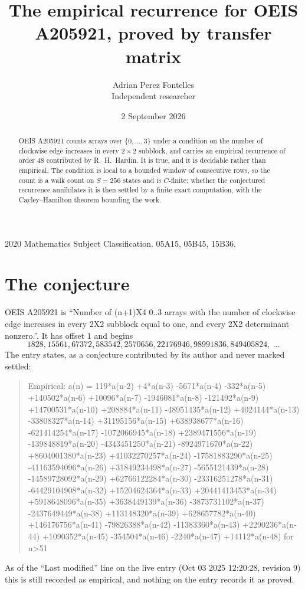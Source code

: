 \documentclass[11pt,a4paper]{article}
\title{The empirical recurrence for OEIS A205921, proved by transfer matrix}
\author{Adrian Perez Fontelles\\ \small Independent researcher}
\date{2 September 2026}
\theoremstyle{plain}
\theoremstyle{definition}
\begin{document}
\maketitle

\begin{abstract}
OEIS A205921 counts arrays over $\{0,\dots,3\}$ under a condition on the number of clockwise edge increases
in every $2\times2$ subblock, and carries an empirical recurrence of order $48$ contributed by
R.~H.~Hardin. It is true, and it is decidable rather than empirical. The condition is local to
a bounded window of consecutive rows, so the count is a walk count on $S=256$ states and is
$C$-finite; whether the conjectured recurrence annihilates it is then settled by a finite exact
computation, with the Cayley--Hamilton theorem bounding the work.
\end{abstract}

\noindent\small 2020 Mathematics Subject Classification. 05A15, 05B45, 15B36.\normalsize

\section{The conjecture}

OEIS A205921 is ``Number of (n+1)X4 0..3 arrays with the number of clockwise edge increases in every 2X2 subblock equal to one, and every 2X2 determinant nonzero.''. It has offset $1$ and begins
\[
1828, 15561, 67372, 583542, 2570656, 22176946, 98991836, 849405824,\ \dots
\]
The entry states, as a conjecture contributed by its author and never marked settled:
\begin{quote}
Empirical: a(n) = 119*a(n-2) +4*a(n-3) -5671*a(n-4) -332*a(n-5) +140502*a(n-6) +10096*a(n-7) -1946081*a(n-8) -121492*a(n-9) +14700531*a(n-10) +208884*a(n-11) -48951435*a(n-12) +4024144*a(n-13) -33808327*a(n-14) +31195156*a(n-15) +638938677*a(n-16) -621414254*a(n-17) -1072066945*a(n-18) +2389471556*a(n-19) -139848819*a(n-20) -4343451250*a(n-21) -8924971670*a(n-22) +8604001380*a(n-23) +41032270257*a(n-24) -17581883290*a(n-25) -41163594096*a(n-26) +31849234498*a(n-27) -5655121439*a(n-28) -14589728092*a(n-29) +62766122284*a(n-30) -23316251278*a(n-31) -64429104908*a(n-32) +15204624364*a(n-33) +20441413453*a(n-34) +5918648096*a(n-35) +3638449139*a(n-36) -3873731102*a(n-37) -2437649449*a(n-38) +113148320*a(n-39) +628657782*a(n-40) +146176756*a(n-41) -79826388*a(n-42) -11383360*a(n-43) +2290236*a(n-44) +1090352*a(n-45) -354504*a(n-46) -2240*a(n-47) +14112*a(n-48) for n>51
\end{quote}
As of the ``Last modified'' line on the live entry (Oct 03 2025 12:20:28, revision 9) this is still
recorded as empirical, and nothing on the entry records it as proved.
\end{document}
